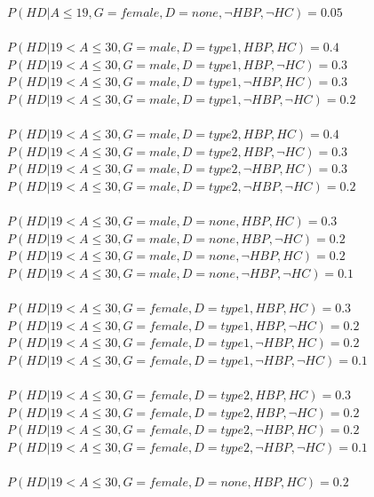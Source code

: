 \documentclass{article}
\begin{document}
$P(HD | A \leq 19, G = female, D = none, \neg HBP, \neg HC) = 0.05$\\
\\
$P(HD | 19 < A \leq 30, G = male, D = type1, HBP, HC) = 0.4 $\\
$P(HD | 19 < A \leq 30, G = male, D = type1, HBP, \neg HC) = 0.3$\\
$P(HD | 19 < A \leq 30, G = male, D = type1, \neg HBP, HC) = 0.3$\\
$P(HD | 19 < A \leq 30, G = male, D = type1, \neg HBP, \neg HC) = 0.2$\\
\\
$P(HD | 19 < A \leq 30, G = male, D = type2, HBP, HC) = 0.4 $\\
$P(HD | 19 < A \leq 30, G = male, D = type2, HBP, \neg HC) = 0.3$\\
$P(HD | 19 < A \leq 30, G = male, D = type2, \neg HBP, HC) = 0.3$\\
$P(HD | 19 < A \leq 30, G = male, D = type2, \neg HBP, \neg HC) = 0.2$\\
\\
$P(HD | 19 < A \leq 30, G = male, D = none, HBP, HC) = 0.3 $\\
$P(HD | 19 < A \leq 30, G = male, D = none, HBP, \neg HC) = 0.2$\\
$P(HD | 19 < A \leq 30, G = male, D = none, \neg HBP, HC) = 0.2$\\
$P(HD | 19 < A \leq 30, G = male, D = none, \neg HBP, \neg HC) = 0.1$\\
\\
$P(HD | 19 < A \leq 30, G = female, D = type1, HBP, HC) = 0.3 $\\
$P(HD | 19 < A \leq 30, G = female, D = type1, HBP, \neg HC) = 0.2$\\
$P(HD | 19 < A \leq 30, G = female, D = type1, \neg HBP, HC) = 0.2$\\
$P(HD | 19 < A \leq 30, G = female, D = type1, \neg HBP, \neg HC) = 0.1$\\
\\
$P(HD | 19 < A \leq 30, G = female, D = type2, HBP, HC) = 0.3 $\\
$P(HD | 19 < A \leq 30, G = female, D = type2, HBP, \neg HC) = 0.2$\\
$P(HD | 19 < A \leq 30, G = female, D = type2, \neg HBP, HC) = 0.2$\\
$P(HD | 19 < A \leq 30, G = female, D = type2, \neg HBP, \neg HC) = 0.1$\\
\\
$P(HD | 19 < A \leq 30, G = female, D = none, HBP, HC) = 0.2 $\\
\end{document}
